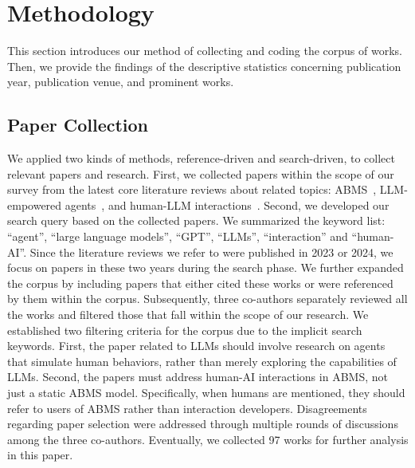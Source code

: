 \section{Methodology}
This section introduces our method of collecting and coding the corpus of works.
Then, we provide the findings of the descriptive statistics concerning publication year, publication venue, and prominent works.
\subsection{Paper Collection}
We applied two kinds of methods, reference-driven and search-driven, to collect relevant papers and research.
First, we collected papers within the scope of our survey from the latest core literature reviews about related topics: ABMS~\cite{gao_large_2023}, LLM-empowered agents~\cite{xi2023risepotentiallargelanguage,wang_survey_2024}, and human-LLM interactions~\cite{10.1145/3613905.3650786}.
Second, we developed our search query based on the collected papers.
We summarized the keyword list: ``agent'',  ``large language models'', ``GPT'', ``LLMs'', ``interaction'' and ``human-AI''.
Since the literature reviews we refer to were published in 2023 or 2024, we focus on papers in these two years during the search phase.
We further expanded the corpus by including papers that either cited these works or were referenced by them within the corpus.
Subsequently, three co-authors separately reviewed all the works and filtered those that fall within the scope of our research.
We established two filtering criteria for the corpus due to the implicit search keywords.
First, the paper related to LLMs should involve research on agents that simulate human behaviors, rather than merely exploring the capabilities of LLMs.
Second, the papers must address human-AI interactions in ABMS, not just a static ABMS model.
Specifically, when humans are mentioned, they should refer to users of ABMS rather than interaction developers.
Disagreements regarding paper selection were addressed through multiple rounds of discussions among the three co-authors.
Eventually, we collected 97 works for further analysis in this paper.


